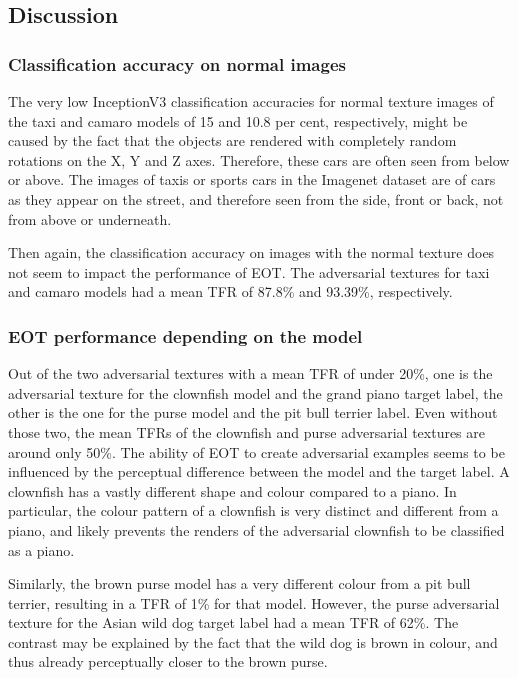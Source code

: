 \newpage
\subsection{Discussion}

\subsubsection{Classification accuracy on normal images}

The very low InceptionV3 classification accuracies for normal texture images of the taxi and camaro models of 15 and 10.8 per cent, respectively, might be caused by the fact that the objects are rendered with completely random rotations on the X, Y and Z axes. Therefore, these cars are often seen from below or above. The images of taxis or sports cars in the Imagenet dataset are of cars as they appear on the street, and therefore seen from the side, front or back, not from above or underneath.

Then again, the classification accuracy on images with the normal texture does not seem to impact the performance of EOT. The adversarial textures for taxi and camaro models had a mean TFR of 87.8\% and 93.39\%, respectively.

\subsubsection{EOT performance depending on the model}

Out of the two adversarial textures with a mean TFR of under 20\%, one is the adversarial texture for the clownfish model and the grand piano target label, the other is the one for the purse model and the pit bull terrier label. Even without those two, the mean TFRs of the clownfish and purse adversarial textures are around only 50\%. The ability of EOT to create adversarial examples seems to be influenced by the perceptual difference between the model and the target label. A clownfish has a vastly different shape and colour compared to a piano. In particular, the colour pattern of a clownfish is very distinct and different from a piano, and likely prevents the renders of the adversarial clownfish to be classified as a piano.

Similarly, the brown purse model has a very different colour from a pit bull terrier, resulting in a TFR of 1\% for that model. However, the purse adversarial texture for the Asian wild dog target label had a mean TFR of 62\%. The contrast may be explained by the fact that the wild dog is brown in colour, and thus already perceptually closer to the brown purse.

